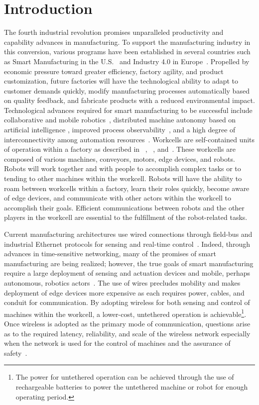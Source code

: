 \section{Introduction} \label{sysml:sec:intro}    
The fourth industrial revolution promises unparalleled productivity and capability advances in manufacturing. To support the manufacturing industry in this conversion, various programs have been established in several countries such as Smart Manufacturing in the U.S.~\cite{SmartManuf} and Industry 4.0 in Europe~\cite{Industry40, cpsInd4.0}. Propelled by economic pressure toward greater efficiency, factory agility, and product customization, future factories will have the technological ability to adapt to customer demands quickly, modify manufacturing processes automatically based on quality feedback, and fabricate products with a reduced environmental impact.  Technological advances required for smart manufacturing to be successful include collaborative and mobile robotics~\cite{indRobot2017}, distributed machine autonomy based on artificial intelligence \cite{ManufAI2009}, improved process observability~\cite{IIoToverview2018}, and a high degree of interconnectivity among automation resources~\cite{ieMag2018}. Workcells are self-contained units of operation within a factory as described in ~\cite{Chen2001.rapid}, ~\cite{Marvel2017}, and~\cite{Ferreira2011}.  These workcells are composed of various machines, conveyors, motors, edge devices, and robots.  Robots will work together and with people to accomplish complex tasks or to tending to other machines within the workcell.  Robots will have the ability to roam between workcells within a factory, learn their roles quickly, become aware of edge devices, and communicate with other actors within the workcell to accomplish their goals. Efficient communications between robots and the other players in the workcell are essential to the fulfillment of the robot-related tasks.



Current manufacturing architectures use wired connections through field-bus and industrial Ethernet protocols for sensing and real-time control~\cite{etherCAT, indPrinter}.  Indeed, through advances in time-sensitive networking, many of the promises of smart manufacturing are being realized; however, the true goals of smart manufacturing require a large deployment of sensing and actuation devices and mobile, perhaps autonomous, robotics actors~\cite{ieMag2018}.  The use of wires precludes mobility and makes deployment of edge devices more expensive as each  requires power, cables, and conduit for communication. By adopting wireless for both sensing and control of machines within the workcell, a lower-cost, untethered operation is achievable\footnote{The power for untethered operation can be achieved through the use of rechargeable batteries to power the untethered machine or robot for enough operating period.}. Once wireless is adopted as the primary mode of communication, questions arise as to the required latency, reliability, and scale of the wireless network especially when the network is used for the control of machines and the assurance of safety~\cite{ieMag2018}. 

